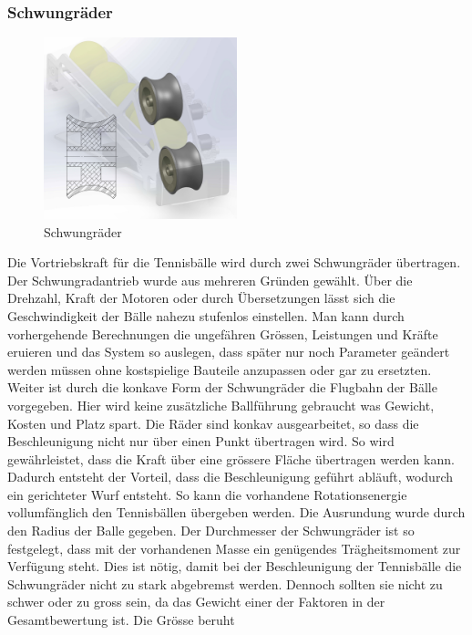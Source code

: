 \subsubsection{Schwungräder}
\begin{figure}
	\centering
	\includegraphics[width=0.5\textwidth]{Enddokumentation/Loesungskonzept/Bilder/Schwungraeder.jpg}
	\caption{Schwungräder}
	\label{fig:Schwungräder}	
\end{figure}
Die Vortriebskraft für die Tennisbälle wird durch zwei Schwungräder übertragen. Der
Schwungradantrieb wurde aus mehreren Gründen gewählt. Über die Drehzahl, Kraft der Motoren oder
durch Übersetzungen lässt sich die Geschwindigkeit der Bälle nahezu stufenlos einstellen. Man kann
durch vorhergehende Berechnungen die ungefähren Grössen, Leistungen und Kräfte eruieren und das
System so auslegen, dass später nur noch Parameter geändert werden müssen ohne kostspielige Bauteile
anzupassen oder gar zu ersetzten. Weiter ist durch die konkave Form der Schwungräder die Flugbahn
der Bälle vorgegeben. Hier wird keine zusätzliche Ballführung gebraucht was Gewicht, Kosten und
Platz spart. Die Räder sind konkav ausgearbeitet, so dass die Beschleunigung nicht nur über einen
Punkt übertragen wird. So wird gewährleistet, dass die Kraft über eine grössere Fläche
übertragen werden kann. Dadurch entsteht der Vorteil, dass die Beschleunigung geführt
abläuft, wodurch ein gerichteter Wurf entsteht. So kann die vorhandene Rotationsenergie vollumfänglich 
den Tennisbällen übergeben werden. Die Ausrundung wurde durch den Radius der Balle
gegeben. Der Durchmesser der Schwungräder ist so festgelegt, dass mit der vorhandenen Masse ein
genügendes Trägheitsmoment zur Verfügung steht. Dies ist nötig, damit bei der Beschleunigung der
Tennisbälle die Schwungräder nicht zu stark abgebremst werden. Dennoch sollten sie nicht zu schwer
oder zu gross sein, da das Gewicht einer der Faktoren in der Gesamtbewertung ist. Die Grösse beruht
